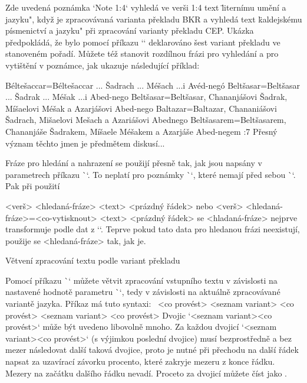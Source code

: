 Zde uvedená poznámka `Note 1:4` vyhledá ve verši 1:4 text \"liternímu umění a jazyku",
když je zpracovávaná varianta překladu BKR a vyhledá text
\"kaldejskému písmenictví a jazyku" při zpracování varianty překladu CEP.
Ukázka předpokládá, že bylo pomocí příkazu `\variants` deklarováno šest
variant překladu ve stanoveném pořadí. Můžete též stanovit rozdílnou frázi
pro vyhledání a pro vytištění v poznámce, jak ukazuje následující příklad:

\begtt
{}  %
    {Béltešaccar}={Béltešaccar ... Šadrach ... Méšach ...i Avéd-negó} %
    {Beltšasar}={Beltšasar ... Šadrak ... Méšak ...i Abed-nego}  %
    {Beltšasar}={Beltšasar, Chananjášovi Šadrak, Míšaelovi Méšak a Azarjášovi Abed-nego}
    {Baltazar}={Baltazar, Chananiášovi Šadrach, Mišaelovi Mešach a Azariášovi Abednego}
    {Beltšasarem}={Beltšasarem, Chananjáše Šadrakem, Míšaele Méšakem a Azarjáše Abed-negem}
:7  {} Přesný význam těchto jmen je předmětem diskusí...
\endtt

Fráze pro hledání a nahrazení se použijí přesně tak, jak jsou napsány v
parametrech příkazu \`\ww`. To neplatí pro poznámky \`\Note`, které nemají
před sebou \`\ww`. Pak při použití

\begtt
\Note <verš> {<hledaná-fráze>} <text> <prázdný řádek>
\endtt
nebo
\begtt
\Note <verš> {<hledaná-fráze>}={<co-vytisknout>} <text> <prázdný řádek>
\endtt
se <hladaná-fráze> nejprve transformuje podle dat z `\vdef`. Teprve pokud
tato data pro hledanou frázi neexistují, použije se <hledaná-fráze> tak,
jak je.


\secc Větvení zpracování textu podle variant překladu

Pomocí příkazu \`\switch` můžete větvit zpracování vstupního textu v
závislosti na nastavené hodnotě parametru \`\tmark`, tedy v závislosti na
aktuálně zpracovávané variantě jazyka. Příkaz má tuto syntaxi:
\begtt
{} {<co provést>}%
        {<seznam variant>} {<co provést>}%
        {<seznam variant>} {<co provést>}
\endtt
Dvojic `{<seznam variant>}{<co provést>}` může být uvedeno libovolně mnoho.
Za každou dvojicí `{<seznam variant>}{<co provést>}` (s výjimkou poslední
dvojice) musí bezprostředně a bez mezer následovat další taková dvojice,
proto je nutné při přechodu na
další řádek napsat za uzavírací závorku procento, které zakryje mezeru z
konce řádku. Mezery na začátku dalšího řádku nevadí.
Proceto za dvojicí můžete číst jako .

